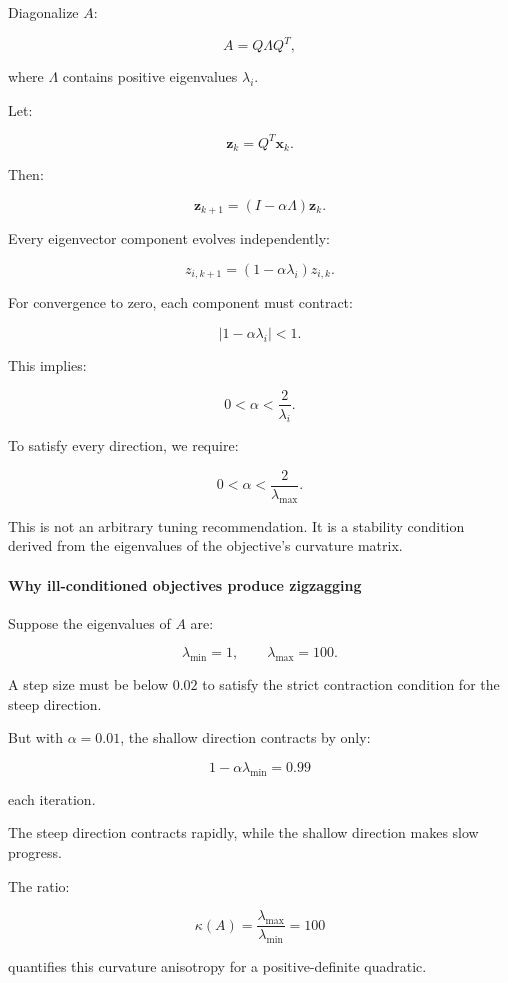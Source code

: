 Diagonalize \(A\):

\[
A=Q\Lambda Q^T,
\]

where \(\Lambda\) contains positive eigenvalues \(\lambda_i\).

Let:

\[
\mathbf z_k=Q^T\mathbf x_k.
\]

Then:

\[
\mathbf z_{k+1} = (I-\alpha\Lambda)\mathbf z_k.
\]

Every eigenvector component evolves independently:

\[
\boxed{ z_{i,k+1}=(1-\alpha\lambda_i)z_{i,k} }.
\]

For convergence to zero, each component must contract:

\[
|1-\alpha\lambda_i|<1.
\]

This implies:

\[
0<\alpha<\frac2{\lambda_i}.
\]

To satisfy every direction, we require:

\[
\boxed{ 0<\alpha<\frac2{\lambda_{\max}} }.
\]

This is not an arbitrary tuning recommendation. It is a stability condition derived from the eigenvalues of the objective's curvature matrix.

\paragraph{Why ill-conditioned objectives produce zigzagging}\label{02-foundations-ii-ch026-why-ill-conditioned-objectives-produce-zigzagging}

Suppose the eigenvalues of \(A\) are:

\[
\lambda_{\min}=1, \qquad \lambda_{\max}=100.
\]

A step size must be below \(0.02\) to satisfy the strict contraction condition for the steep direction.

But with \(\alpha=0.01\), the shallow direction contracts by only:

\[
1-\alpha\lambda_{\min}=0.99
\]

each iteration.

The steep direction contracts rapidly, while the shallow direction makes slow progress.

The ratio:

\[
\boxed{\kappa(A)=\frac{\lambda_{\max}}{\lambda_{\min}}=100}
\]

quantifies this curvature anisotropy for a positive-definite quadratic.

